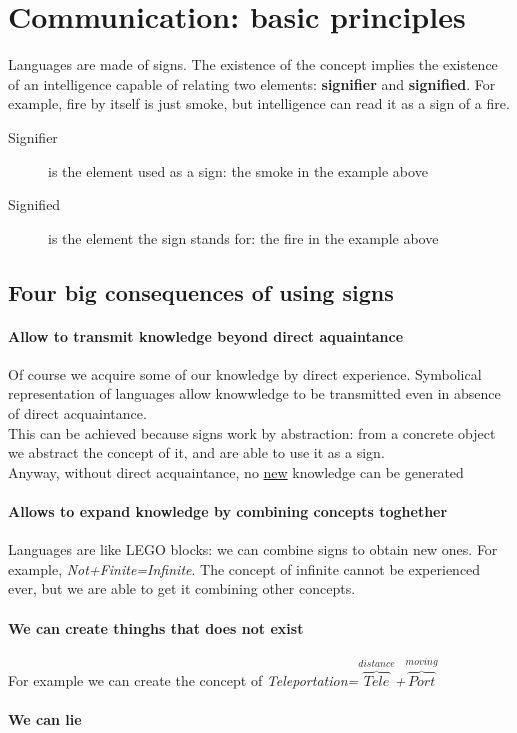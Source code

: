 \documentclass{article}
\begin{document}
\section{Communication: basic principles}
Languages are made of signs. The existence of the concept implies the existence of an intelligence capable of relating two elements: \textbf{signifier} and \textbf{signified}. For example, fire by itself is just smoke, but intelligence can read it as a sign of a fire.
\begin{description}
\item[Signifier] is the element used as a sign: the smoke in the example above
\item[Signified] is the element the sign stands for: the fire in the example above
\end{description}


\subsection{Four big consequences of using signs}
\paragraph{Allow to transmit knowledge beyond direct aquaintance} Of course we acquire some of our knowledge by direct experience. Symbolical representation of languages allow knowwledge to be transmitted even in absence of direct acquaintance.\\ 
This can be achieved because signs work by abstraction: from a concrete object we abstract the concept of it, and are able to use it as a sign.\\
Anyway, without direct acquaintance, no \underline{new} knowledge can be generated
\paragraph{Allows to expand knowledge by  combining concepts toghether} Languages are like LEGO blocks: we can combine signs to obtain new ones. For example, \textit{Not+Finite=Infinite}. The concept of infinite cannot be experienced ever, but we are able to get it combining other concepts.
\paragraph{We can create thinghs that does not exist} For example we can create the concept of \textit{Teleportation=$\overbrace{Tele}^{distance}$+$\overbrace{Port}^{moving}$}
\paragraph{We can lie}
\end{document}

